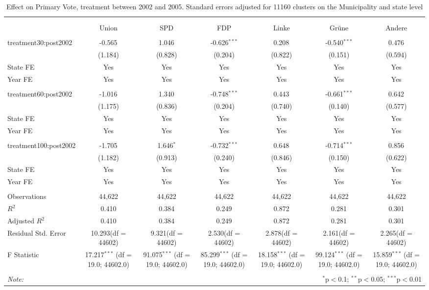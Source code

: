 \documentclass[12pt]{article}
\begin{document}
 
\begin{table}[!htbp] \centering
  \caption{Effect on Primary Vote, treatment between 2002 and 2005. Standard errors adjusted for 11160 clusters on the Municipality and state level}
\begin{tabular}{@{\extracolsep{5pt}}lcccccc}
\\[-1.8ex]\hline
\hline \\[-1.8ex]
\\[-1.8ex] & \multicolumn{1}{c}{Union} & \multicolumn{1}{c}{SPD} & \multicolumn{1}{c}{FDP} & \multicolumn{1}{c}{Linke} & \multicolumn{1}{c}{Grüne} & \multicolumn{1}{c}{Andere}  \\
\hline \\[-1.8ex]
 treatment30:post2002 & -0.565$^{}$ & 1.046$^{}$ & -0.626$^{***}$ & 0.208$^{}$ & -0.540$^{***}$ & 0.476$^{}$ \\
  & (1.184) & (0.828) & (0.204) & (0.822) & (0.151) & (0.594) \\
 State FE & Yes & Yes & Yes & Yes & Yes & Yes \\
 Year FE & Yes & Yes & Yes & Yes & Yes & Yes \\
\hline \\[-1.8ex]
 treatment60:post2002 & -1.016$^{}$ & 1.340$^{}$ & -0.748$^{***}$ & 0.443$^{}$ & -0.661$^{***}$ & 0.642$^{}$ \\
  & (1.175) & (0.836) & (0.204) & (0.740) & (0.140) & (0.577) \\
 State FE & Yes & Yes & Yes & Yes & Yes & Yes \\
 Year FE & Yes & Yes & Yes & Yes & Yes & Yes \\
\hline \\[-1.8ex]
 treatment100:post2002 & -1.705$^{}$ & 1.646$^{*}$ & -0.732$^{***}$ & 0.648$^{}$ & -0.714$^{***}$ & 0.856$^{}$ \\
  & (1.182) & (0.913) & (0.240) & (0.846) & (0.150) & (0.622) \\
 State FE & Yes & Yes & Yes & Yes & Yes & Yes \\
 Year FE & Yes & Yes & Yes & Yes & Yes & Yes \\
\hline \\[-1.8ex]
 Observations & 44,622 & 44,622 & 44,622 & 44,622 & 44,622 & 44,622 \\
 $R^2$ & 0.410 & 0.384 & 0.249 & 0.872 & 0.281 & 0.301 \\
 Adjusted $R^2$ & 0.410 & 0.384 & 0.249 & 0.872 & 0.281 & 0.301 \\
 Residual Std. Error & 10.293(df = 44602) & 9.321(df = 44602) & 2.530(df = 44602) & 2.878(df = 44602) & 2.161(df = 44602) & 2.265(df = 44602)  \\
 F Statistic & 17.217$^{***}$ (df = 19.0; 44602.0) & 91.075$^{***}$ (df = 19.0; 44602.0) & 85.299$^{***}$ (df = 19.0; 44602.0) & 18.158$^{***}$ (df = 19.0; 44602.0) & 99.124$^{***}$ (df = 19.0; 44602.0) & 15.859$^{***}$ (df = 19.0; 44602.0) \\
\hline
\hline \\[-1.8ex]
\textit{Note:} & \multicolumn{6}{r}{$^{*}$p$<$0.1; $^{**}$p$<$0.05; $^{***}$p$<$0.01} \\
\end{tabular}
\end{table}
\end{document}
